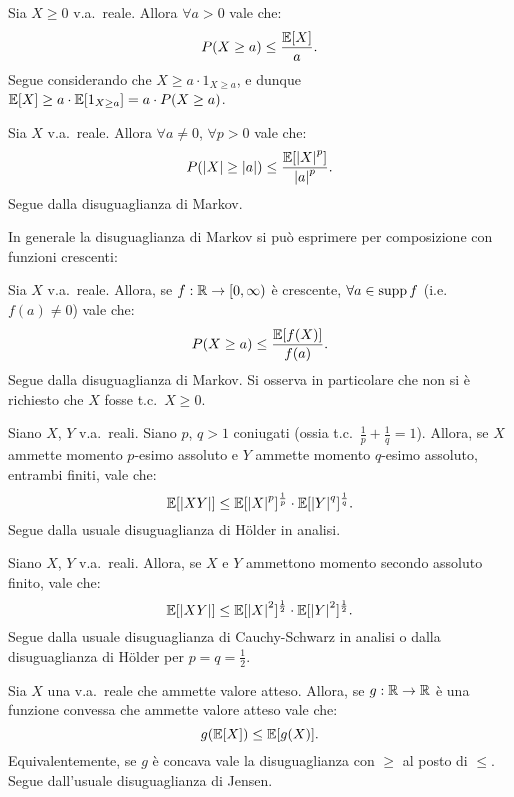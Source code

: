 \begin{multicols*}{2}
\begin{proposition}
    Sia $X \geq 0$ v.a.~reale. Allora $\forall a > 0$ vale che:
    \[
        P(X \geq a) \leq \frac{\mathbb{E}[X]}{a}.
    \]
    Segue considerando che $X \geq a \cdot 1_{X \geq a}$,
    e dunque $\mathbb{E}[X] \geq a \cdot \mathbb{E}[1_{X \geq a}] = a \cdot P(X \geq a)$.
\end{proposition}

\begin{corollary}
    Sia $X$ v.a.~reale. Allora $\forall a \neq 0$, $\forall p > 0$ vale che:
    \[
        P(\left\lvert X \right\rvert \geq \left\lvert a \right\rvert) \leq \frac{\mathbb{E}[\left\lvert X \right\rvert^p]}{\left\lvert a \right\rvert^p}.
    \]
    Segue dalla disuguaglianza di Markov.
\end{corollary}

In generale la disuguaglianza di Markov si può esprimere per composizione
con funzioni crescenti:

\begin{corollary}
    Sia $X$ v.a.~reale. Allora, se $f : \mathbb{R} \to [0, \infty)$ è crescente, $\forall a \in \operatorname{supp} f$ (i.e.~$f(a) \neq 0$) vale che:
    \[
        P(X \geq a) \leq \frac{\mathbb{E}[f(X)]}{f(a)}.
    \]
    Segue dalla disuguaglianza di Markov. Si osserva in particolare che non si è richiesto
    che $X$ fosse t.c.~$X \geq 0$.
\end{corollary}

\begin{proposition}
    Siano $X$, $Y$ v.a.~reali. Siano $p$, $q > 1$ coniugati (ossia t.c.~$\frac{1}{p} + \frac{1}{q} = 1$). Allora, se $X$ ammette momento $p$-esimo assoluto e $Y$ ammette momento
    $q$-esimo assoluto, entrambi finiti, vale che:
    \[
        \mathbb{E}[\left\lvert XY \right\rvert] \leq \mathbb{E}[\left\lvert X \right\rvert^p]^{\frac{1}{p}} \cdot \mathbb{E}[\left\lvert Y \right\rvert^q]^{\frac{1}{q}}.
    \]
    Segue dalla usuale disuguaglianza di Hölder in analisi.
\end{proposition}

\begin{proposition}
    Siano $X$, $Y$ v.a.~reali. Allora, se $X$ e $Y$ ammettono momento secondo assoluto
    finito, vale che:
    \[
        \mathbb{E}[\left\lvert XY \right\rvert] \leq \mathbb{E}[\left\lvert X \right\rvert^2]^{\frac{1}{2}} \cdot \mathbb{E}[\left\lvert Y \right\rvert^2]^{\frac{1}{2}}.
    \]
    Segue dalla usuale disuguaglianza di Cauchy-Schwarz in analisi o dalla disuguaglianza
    di Hölder per $p = q = \frac{1}{2}$.
\end{proposition}

\begin{proposition}
    Sia $X$ una v.a.~reale che ammette valore atteso.
    Allora, se $g : \mathbb{R} \to \mathbb{R}$ è una funzione
    convessa che ammette valore atteso vale che:
    \[
        g(\mathbb{E}[X]) \leq \mathbb{E}[g(X)].
    \]
    Equivalentemente, se $g$ è concava vale la disuguaglianza con
    $\geq$ al posto di $\leq$. Segue dall'usuale disuguaglianza di Jensen.
\end{proposition}


\end{multicols*}
